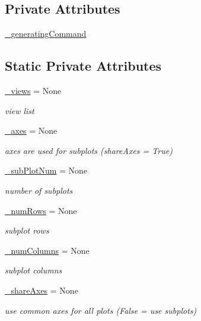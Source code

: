 \subsection*{Private Attributes}
\begin{DoxyCompactItemize}
\item 
\hyperlink{class_mu_mo_t_1_1_mu_mo_t_1_1_mu_mo_tmulti_view_ace48ed03490093d8f44cde91e2f1e86e}{\+\_\+generating\+Command}
\end{DoxyCompactItemize}
\subsection*{Static Private Attributes}
\begin{DoxyCompactItemize}
\item 
\hyperlink{class_mu_mo_t_1_1_mu_mo_t_1_1_mu_mo_tmulti_view_af533f289cf818694f54ab8bd57083537}{\+\_\+views} = None
\begin{DoxyCompactList}\small\item\em view list \end{DoxyCompactList}\item 
\hyperlink{class_mu_mo_t_1_1_mu_mo_t_1_1_mu_mo_tmulti_view_a302b03ed97754a48ed830efba51e8d37}{\+\_\+axes} = None
\begin{DoxyCompactList}\small\item\em axes are used for subplots (\textquotesingle{}share\+Axes = True\textquotesingle{}) \end{DoxyCompactList}\item 
\hyperlink{class_mu_mo_t_1_1_mu_mo_t_1_1_mu_mo_tmulti_view_a9b9e6dc4ee0823b917bb0ee0d636f84d}{\+\_\+sub\+Plot\+Num} = None
\begin{DoxyCompactList}\small\item\em number of subplots \end{DoxyCompactList}\item 
\hyperlink{class_mu_mo_t_1_1_mu_mo_t_1_1_mu_mo_tmulti_view_a7943427bc009bd206f958f785e744381}{\+\_\+num\+Rows} = None
\begin{DoxyCompactList}\small\item\em subplot rows \end{DoxyCompactList}\item 
\hyperlink{class_mu_mo_t_1_1_mu_mo_t_1_1_mu_mo_tmulti_view_ac14e35edb2af762045879408234589d5}{\+\_\+num\+Columns} = None
\begin{DoxyCompactList}\small\item\em subplot columns \end{DoxyCompactList}\item 
\hyperlink{class_mu_mo_t_1_1_mu_mo_t_1_1_mu_mo_tmulti_view_a564f1d8714ede71e8f36f29d64193518}{\+\_\+share\+Axes} = None
\begin{DoxyCompactList}\small\item\em use common axes for all plots (False = use subplots) \end{DoxyCompactList}\end{DoxyCompactItemize}
